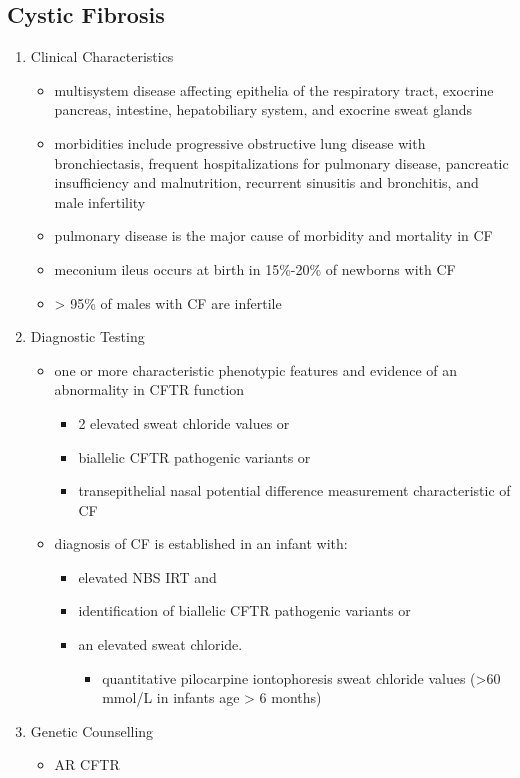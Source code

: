 \documentclass[12pt]{scrartcl}
\begin{document}
\subsection{Cystic Fibrosis}
\label{sec:orgd26fb54}
\begin{enumerate}
\item Clinical Characteristics
\label{sec:org68d33cc}
\begin{itemize}
\item multisystem disease affecting epithelia of the respiratory tract, exocrine pancreas, intestine, hepatobiliary system, and exocrine sweat glands
\item morbidities include progressive obstructive lung disease with bronchiectasis, frequent hospitalizations for pulmonary disease, pancreatic insufficiency and malnutrition, recurrent sinusitis and bronchitis, and male infertility
\item pulmonary disease is the major cause of morbidity and mortality in CF
\item meconium ileus occurs at birth in 15\%-20\% of newborns with CF
\item \textgreater{} 95\% of males with CF are infertile
\end{itemize}

\item Diagnostic Testing
\label{sec:orgd208b20}
\begin{itemize}
\item one or more characteristic phenotypic features and evidence of an abnormality in CFTR function
\begin{itemize}
\item 2 elevated sweat chloride values or
\item biallelic CFTR pathogenic variants or
\item transepithelial nasal potential difference measurement characteristic of CF
\end{itemize}
\item diagnosis of CF is established in an infant with:
\begin{itemize}
\item elevated NBS IRT and
\item identification of biallelic CFTR pathogenic variants or
\item an elevated sweat chloride.
\begin{itemize}
\item quantitative pilocarpine iontophoresis sweat chloride values (>60 mmol/L in infants age > 6 months)
\end{itemize}
\end{itemize}
\end{itemize}
\item Genetic Counselling
\label{sec:org83847eb}
\begin{itemize}
\item AR CFTR
\end{itemize}
\end{enumerate}
\end{document}
